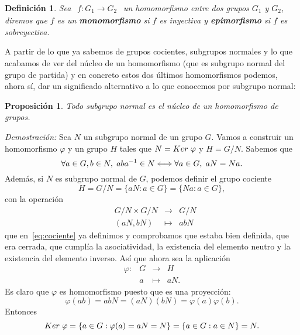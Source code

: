 \documentclass[12pt]{article}
\newtheorem{proposition}[theorem]{Proposición}
\newtheorem{definition}[theorem]{Definición}
\begin{document}
\begin{definition}Sea $
\begin{array}{rccl}
f\colon G_{1} \longrightarrow  G_{2}
\end{array}
$ un homomorfismo entre dos grupos $G_{1}$ y $G_{2}$, diremos que $f$ es un \textbf{monomorfismo} si $f$ es inyectiva y \textbf{epimorfismo} si $f$ es sobreyectiva.
\end{definition}

A partir de lo que ya sabemos de grupos cocientes, subgrupos normales y lo que acabamos de ver del núcleo de un homomorfismo (que es subgrupo normal del grupo de partida) y en concreto estos dos últimos homomorfismos podemos, ahora sí, dar un significado alternativo a lo que conocemos por subgrupo normal:

\begin{proposition} Todo subgrupo normal es el núcleo de un homomorfismo de grupos.
\end{proposition}
\emph{Demostración: } Sea $N$ un subgrupo normal de un grupo $G$. Vamos a construir un homomorfismo $\varphi$ y un grupo $H$ tales que $N = Ker \hspace{0.1cm} \varphi$ y $H = G/N$. Sabemos que $$\forall a \in G, b \in N, \hspace{0.1cm} aba^{-1} \in N \Longleftrightarrow \forall a \in G, \hspace{0.1cm} aN = Na.$$ Además, si $N$ es subgrupo normal de $G$, podemos definir el grupo cociente $$H = G/N  = \lbrace aN :a \in G \rbrace = \lbrace Na : a \in G\rbrace,$$ con la operación $$\begin{array}{rccl}
&G/N \times G/N & \longrightarrow & G/N\\
&(aN,bN)& \longmapsto &abN
\end{array}
$$ que en~\ref{eq:cociente} ya definimos y comprobamos que estaba bien definida, que era cerrada, que cumplía la asociatividad, la existencia del elemento neutro y la existencia del elemento inverso. Así que ahora sea la aplicación $$\begin{array}{rccl}
\varphi \colon &G & \longrightarrow & H\\
&a & \longmapsto &aN.
\end{array}
$$  Es claro que $\varphi$ es homomorfismo puesto que es una proyección: $$\varphi(ab) = abN = (aN)(bN) = \varphi(a) \varphi(b).$$ Entonces $$Ker\hspace{0.1cm} \varphi = \lbrace a \in G : \varphi(a) = aN = N \rbrace = \lbrace a \in G : a \in N \rbrace = N.$$
\end{document}
